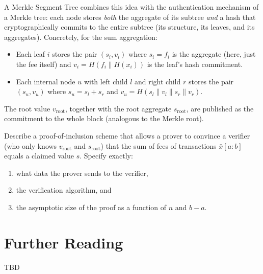\begin{problems}
                A Merkle Segment Tree combines this idea with the authentication mechanism of a
                Merkle tree: each node stores \emph{both} the aggregate of its subtree
                \emph{and} a hash that cryptographically commits to the entire subtree (its
                structure, its leaves, and its aggregates). Concretely, for the sum aggregation:
                \begin{itemize}
                \item Each leaf $i$ stores the pair $(s_i, v_i)$ where $s_i = f_i$ is the
                    aggregate (here, just the fee itself) and $v_i = H(f_i \| H(x_i))$ is
                    the leaf's hash commitment.
                \item Each internal node $u$ with left child $l$ and right child $r$ stores
                    the pair $(s_u, v_u)$ where $s_u = s_l + s_r$ and
                    $v_u = H(s_l \| v_l \| s_r \| v_r)$.
                \end{itemize}
                The root value $v_\text{root}$, together with the root aggregate
                $s_\text{root}$, are published as the commitment to the whole block (analogous
                to the Merkle root).

                Describe a proof-of-inclusion scheme that allows a prover to convince a verifier
                (who only knows $v_\text{root}$ and $s_\text{root}$) that the sum of fees of
                transactions $\bar{x}[a{:}b]$ equals a claimed value $s$. Specify exactly:
                \begin{enumerate}
                \item what data the prover sends to the verifier,
                \item the verification algorithm, and
                \item the asymptotic size of the proof as a function of $n$ and $b - a$.
                \end{enumerate}
\end{problems}

\section*{Further Reading}

TBD
